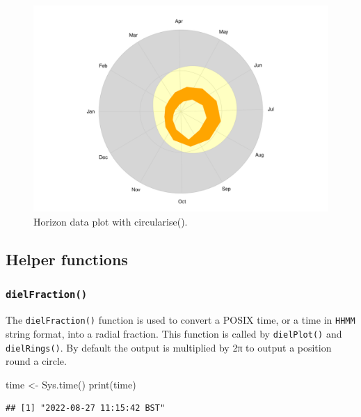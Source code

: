 \documentclass[
]{book}
\newenvironment{Shaded}{\begin{snugshade}}{\end{snugshade}}
\newcommand{\FunctionTok}[1]{\textcolor[rgb]{0.00,0.00,0.00}{#1}}
\newcommand{\NormalTok}[1]{#1}
\newcommand{\OtherTok}[1]{\textcolor[rgb]{0.56,0.35,0.01}{#1}}
\begin{document}
\begin{figure}

{\centering \includegraphics[width=0.9\linewidth]{_main_files/figure-latex/lyme-temp-2-1} 

}

\caption{Horizon data plot with circularise().}\label{fig:lyme-temp-2}
\end{figure}

\hypertarget{helper-functions}{%
\subsection{Helper functions}\label{helper-functions}}

\hypertarget{dielfraction}{%
\subsubsection{\texorpdfstring{\texttt{dielFraction()}}{dielFraction()}}\label{dielfraction}}

The \texttt{dielFraction()} function is used to convert a POSIX time, or a time in \texttt{HHMM} string format, into a radial fraction. This function is called by \texttt{dielPlot()} and \texttt{dielRings()}. By default the output is multiplied by 2π to output a position round a circle.

\begin{Shaded}
\begin{Highlighting}[]
\NormalTok{time }\OtherTok{\textless{}{-}} \FunctionTok{Sys.time}\NormalTok{()}
\FunctionTok{print}\NormalTok{(time)}
\end{Highlighting}
\end{Shaded}

\begin{verbatim}
## [1] "2022-08-27 11:15:42 BST"
\end{verbatim}
\end{document}
